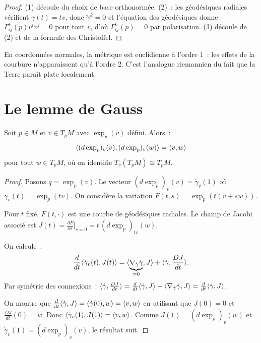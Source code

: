 \begin{proof}
(1) d\'ecoule du choix de base orthonorm\'ee. (2)~: les g\'eod\'esiques radiales
v\'erifient $\gamma(t) = tv$, donc $\ddot\gamma^k = 0$ et l'\'equation des g\'eod\'esiques
donne $\Gamma^k_{ij}(p) v^i v^j = 0$ pour tout $v$, d'o\`u $\Gamma^k_{ij}(p) = 0$
par polarisation. (3) d\'ecoule de (2) et de la formule des Christoffel.
\end{proof}

\begin{intuition}[title=\textbf{Coordonn\'ees normales = lin\'earisation de la g\'eom\'etrie}]
En coordonn\'ees normales, la m\'etrique est euclidienne \`a l'ordre $1$~: les
effets de la courbure n'apparaissent qu'\`a l'ordre $2$. C'est l'analogue
riemannien du fait que la Terre para\^it plate localement.
\end{intuition}

\section{Le lemme de Gauss}

\begin{lemme}
\label{lem:gauss}
Soit $p \in M$ et $v \in T_pM$ avec $\exp_p(v)$ d\'efini. Alors~:
\[
    \langle (d\exp_p)_v(v), (d\exp_p)_v(w) \rangle = \langle v, w \rangle
\]
pour tout $w \in T_pM$, o\`u on identifie $T_v(T_pM) \cong T_pM$.
\end{lemme}

\begin{proof}
Posons $q = \exp_p(v)$. Le vecteur $(d\exp_p)_v(v) = \dot\gamma_v(1)$ o\`u
$\gamma_v(t) = \exp_p(tv)$. On consid\`ere la variation
$F(t,s) = \exp_p(t(v + sw))$.

Pour $t$ fix\'e, $F(t, \cdot)$ est une courbe de g\'eod\'esiques radiales.
Le champ de Jacobi associ\'e est $J(t) = \frac{\partial F}{\partial s}\big|_{s=0}
= t\, (d\exp_p)_{tv}(w)$.

On calcule~:
\[
    \frac{d}{dt}\langle \dot\gamma_v(t), J(t) \rangle
    = \langle \underbrace{\nabla_{\dot\gamma}\dot\gamma}_{=0}, J \rangle
    + \langle \dot\gamma, \frac{DJ}{dt} \rangle.
\]
Par sym\'etrie des connexions~:
$\langle \dot\gamma, \frac{DJ}{dt} \rangle = \frac{d}{dt}\langle \dot\gamma, J \rangle
- \langle \nabla_{\dot\gamma}\dot\gamma, J \rangle
= \frac{d}{dt}\langle \dot\gamma, J \rangle$.

On montre que $\frac{d}{dt}\langle \dot\gamma, J \rangle = \langle \dot\gamma(0), w \rangle = \langle v, w \rangle$
en utilisant que $J(0) = 0$ et $\frac{DJ}{dt}(0) = w$. Donc
$\langle \dot\gamma_v(1), J(1) \rangle = \langle v, w \rangle$.
Comme $J(1) = (d\exp_p)_v(w)$ et $\dot\gamma_v(1) = (d\exp_p)_v(v)$, le r\'esultat suit.
\end{proof}

